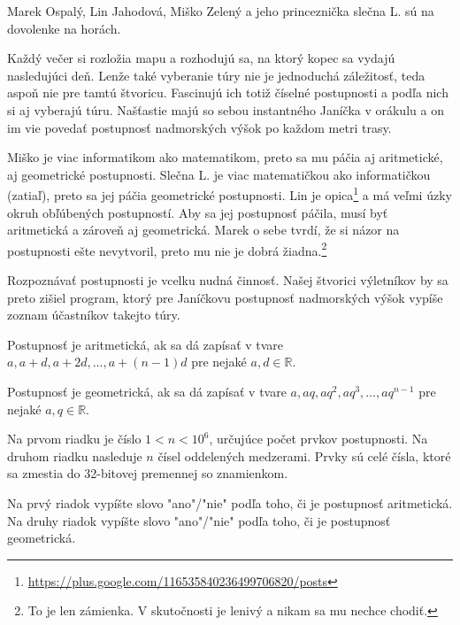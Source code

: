 




Marek Ospalý, Lin Jahodová, Miško Zelený a jeho princeznička slečna L. sú na
dovolenke na horách.

Každý večer si rozložia mapu a rozhodujú sa, na ktorý kopec sa vydajú
nasledujúci deň. Lenže také vyberanie túry nie je jednoduchá záležitosť, teda
aspoň nie pre tamtú štvoricu. Fascinujú ich totiž číselné postupnosti a podľa
nich si aj vyberajú túru. Našťastie majú so sebou instantného Janíčka v
orákulu a on im vie povedať postupnosť nadmorských výšok po každom metri trasy.

Miško je viac informatikom ako matematikom, preto sa mu páčia aj aritmetické, aj
geometrické postupnosti. Slečna L. je viac matematičkou ako informatičkou
(zatiaľ), preto sa jej páčia geometrické postupnosti. Lin
je opica\footnote {\url{https://plus.google.com/116535840236499706820/posts}} a má
veľmi úzky okruh obľúbených postupností. Aby sa jej postupnosť páčila, musí byť
aritmetická a zároveň aj geometrická. Marek o sebe tvrdí, že si názor na postupnosti
ešte nevytvoril, preto mu nie je dobrá žiadna.\footnote{To je len zámienka.
V skutočnosti je lenivý a nikam sa mu nechce chodiť.}


Rozpoznávať postupnosti je vcelku nudná činnosť. Našej štvorici výletníkov by sa
preto zišiel program, ktorý pre Janíčkovu postupnosť nadmorských výšok vypíše
zoznam účastníkov takejto túry.

Postupnosť je aritmetická, ak sa dá zapísať v tvare $a, a+d, a+2d, \dots,
a+(n-1)d$ pre nejaké $a, d \in \mathbb{R}$.

Postupnosť je geometrická, ak sa dá zapísať v tvare $a, aq, aq^2, aq^3, \dots,
aq^{n-1}$ pre nejaké $a, q \in \mathbb{R}$.


Na prvom riadku je číslo $1 < n < 10^{6}$, určujúce počet prvkov postupnosti. Na druhom riadku nasleduje $n$ čísel oddelených medzerami. Prvky sú celé
čísla, ktoré sa zmestia do 32-bitovej premennej so znamienkom.


Na prvý riadok vypíšte slovo "ano"/"nie" podľa toho, či je postupnosť aritmetická.
Na druhy riadok vypíšte slovo "ano"/"nie" podľa toho, či je postupnosť geometrická.


